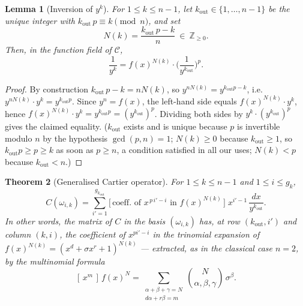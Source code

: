 \documentclass[11pt,a4paper]{article}
\newtheorem{theorem}{Theorem}[section]
\newtheorem{lemma}[theorem]{Lemma}
\begin{document}
\begin{lemma}[Inversion of $y^k$]
\label{lemma:inversion}
For $1\le k\le n-1$, let $k_{\mathrm{out}}\in\{1,\dots,n-1\}$ be the unique
integer with $k_{\mathrm{out}}\,p\equiv k\pmod n$, and set
$$N(k)=\frac{k_{\mathrm{out}}\,p-k}{n}\ \in\ \mathbb{Z}_{\ge0}.$$
Then, in the function field of $\mathcal{C}$,
$$\frac{1}{y^k}=f(x)^{N(k)}\cdot\Big(\frac{1}{y^{k_{\mathrm{out}}}}\Big)^{p}.$$
\end{lemma}

\begin{proof}
By construction $k_{\mathrm{out}}\,p-k=nN(k)$, so $y^{nN(k)}=y^{k_{\mathrm{out}}p-k}$,
i.e.\ $y^{nN(k)}\cdot y^k=y^{k_{\mathrm{out}}p}$. Since $y^n=f(x)$, the left-hand
side equals $f(x)^{N(k)}\cdot y^k$, hence
$f(x)^{N(k)}\cdot y^k=y^{k_{\mathrm{out}}p}=(y^{k_{\mathrm{out}}})^p$. Dividing
both sides by $y^k\cdot(y^{k_{\mathrm{out}}})^p$ gives the claimed equality.
($k_{\mathrm{out}}$ exists and is unique because $p$ is invertible modulo $n$ by
the hypothesis $\gcd(p,n)=1$; $N(k)\ge0$ because $k_{\mathrm{out}}\ge1$, so $k_{\mathrm{out}}p\ge p\ge k$ as soon as $p\ge n$, a condition satisfied in all our uses; $N(k)<p$ because $k_{\mathrm{out}}<n$.)
\end{proof}

\begin{theorem}[Generalised Cartier operator]
\label{thm:A}
For $1\le k\le n-1$ and $1\le i\le g_k$,
$$C(\omega_{i,k})=\sum_{i'=1}^{g_{k_{\mathrm{out}}}}
\Big[\,\text{coeff.\ of } x^{\,p\,i'-i}\text{ in } f(x)^{N(k)}\,\Big]\;
x^{i'-1}\,\frac{dx}{y^{k_{\mathrm{out}}}}.$$
In other words, the matrix of $C$ in the basis $(\omega_{i,k})$ has, at row
$(k_{\mathrm{out}},i')$ and column $(k,i)$, the coefficient of $x^{pi'-i}$ in the
trinomial expansion of $f(x)^{N(k)}=(x^d+\sigma x^r+1)^{N(k)}$ --- extracted, as
in the classical case $n=2$, by the multinomial formula
$$[\,x^{m}\,]\,f(x)^{N}=\sum_{\substack{\alpha+\beta+\gamma=N\\ d\alpha+r\beta=m}}
\binom{N}{\alpha,\beta,\gamma}\,\sigma^{\beta}.$$
\end{theorem}
\end{document}

